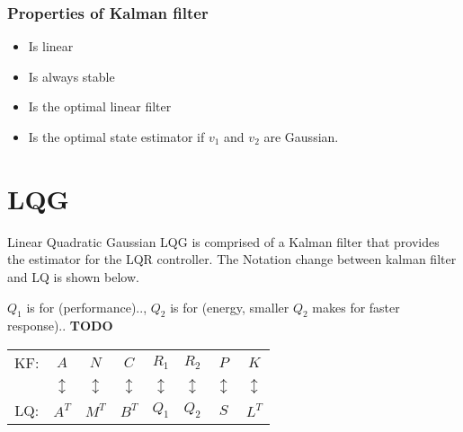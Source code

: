 \begin{multicols}{2}
\subsubsection{Properties of Kalman filter}
\begin{itemize}
    \item Is linear 
    \item Is always stable
    \item Is the optimal linear filter 
    \item Is the optimal state estimator if $v_1$ and $v_2$ are Gaussian.
\end{itemize}


\section{LQG}
Linear Quadratic Gaussian LQG is comprised of a Kalman filter that provides 
the estimator for the LQR controller.
The Notation change between kalman filter and LQ is shown below.

$Q_1$ is for (performance).., $Q_2$ is for (energy, smaller $Q_2$ makes for faster response)..
\textbf{TODO}


\begin{table}[H]
    \centering
    \begin{tabular}{c c c c c c c c} 
    KF: & $A$            & $N$            & $C$            & $R_1$          & $R_2$          & $P$            & $K$ \\ 
        & $\updownarrow$ & $\updownarrow$ & $\updownarrow$ & $\updownarrow$ & $\updownarrow$ & $\updownarrow$ & $\updownarrow$ \\
    LQ: & $A^T$          & $M^T$          & $B^T$          & $Q_1$          & $Q_2$          & $S$            & $L^T$ \\
    \end{tabular}
\end{table}



\end{multicols}

